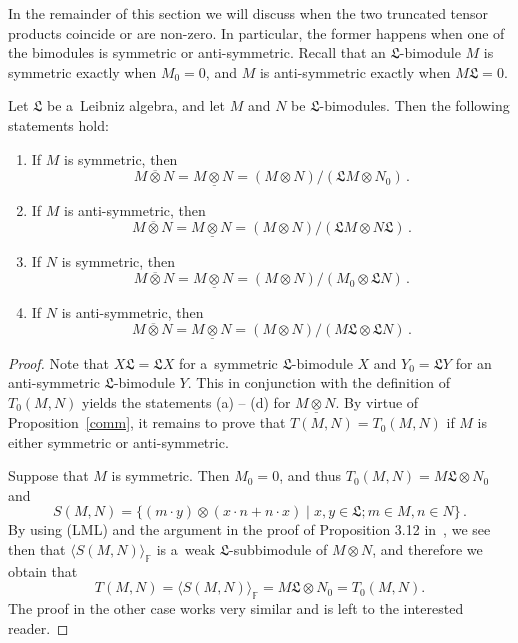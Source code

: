 \documentclass{jonasart}
\newcommand{\fbb}{\mathbb{F}}
\newcommand{\lf}{\mathfrak{L}}
\newcommand{\ovo}{\overline{\otimes}}
\newcommand{\und}{\underline{\otimes}}
\begin{document}
	In the remainder of this section we will discuss when the two truncated tensor products coincide or are non-zero. In particular, the former happens when one of the bimodules is symmetric or anti-symmetric. Recall that an $\lf$-bimodule $M$ is symmetric exactly when $M_0 =0$, and $M$ is anti-symmetric exactly when
	$M\lf=0$.
	\begin{theorem}\label{main}
		Let $\lf$ be a~Leibniz algebra, and let $M$ and $N$ be $\lf$-bimodules. Then the following statements hold:
		\begin{enumerate}
			\item[\textrm{(a)}] If $M$ is symmetric, then
			\[
				M\ovo N=M\und N=(M\otimes N)/(\lf M\otimes N_0 )\,.
			\]
			\item[\textrm{(b)}] If $M$ is anti-symmetric, then
			\[
				M\ovo N=M\und N=(M\otimes N)/(\lf M\otimes N\lf)\,.
			\]
			\item[\textrm{(c)}] If $N$ is symmetric, then
			\[
				M\ovo N=M\und N=(M\otimes N)/(M_0\otimes\lf N)\,.
			\]
			\item[\textrm{(d)}] If $N$ is anti-symmetric, then
			\[
				M\ovo N=M\und N=(M\otimes N)/(M\lf\otimes\lf N)\,.
			\]
		\end{enumerate}
	\end{theorem}

	\begin{proof}
		Note that $X\lf=\lf X$ for a~symmetric $\lf$-bimodule $X$ and $Y_0
		=\lf Y$ for an anti-symmetric $\lf$-bimodule $Y$. This in conjunction with the definition of $T_0 (M,N)$ yields the statements (a) -- (d) for
		$M\und N$. By virtue of Proposition~\ref{comm}, it remains to prove that $T(M,N)=T_0 (M,N)$ if $M$ is either symmetric or anti-symmetric.

		Suppose that $M$ is symmetric. Then $M_0 =0$, and thus $T_0
		(M,N)=M\lf\otimes N_0$ and
		\[
			S(M,N)=\{(m\cdot y)\otimes(x\cdot n+n\cdot x)\mid x,y\in\lf;
			m\in M,n\in N\}\,.
		\]
		By using (LML) and the argument in the proof of Proposition 3.12
		in~\cite{F1}, we see then that $\langle S(M,N)\rangle_\fbb$ is a~weak
		$\lf$-subbimodule of $M\otimes N$, and therefore we obtain that
		\[
            T(M,N)
            =\langle S(M,N)\rangle_\fbb
            =M\lf\otimes N_0
            =T_0 (M,N).
        \]
        The proof in the other case works very similar and is left to the interested reader.
	\end{proof}
\end{document}

